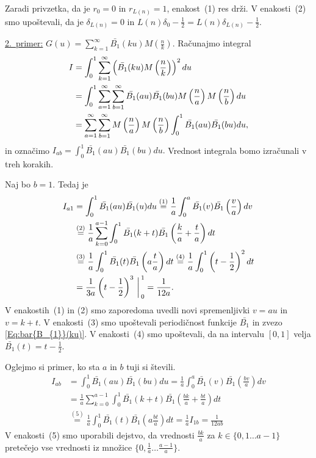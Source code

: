 \documentclass[mat1]{fmfdelo}
\begin{document}
Zaradi privzetka, da je $r_{0}=0$ in $r_{L(n)}=1$, enakost~(1) res drži.
V enakosti~(2) smo upoštevali, da je $\delta_{L(n)}=0$ in $L(n) \delta_{0}-\frac{1}{2} = L(n) \delta_{L(n)}-\frac{1}{2}.$

\underline{2.~primer:} $G(u) = \sum_{k=1}^{\infty} \bar{B_{1}}(ku) M \left(\frac{n}{k} \right)$.
Računajmo integral
\begin{align}
\label{Eq:I_{ab}}
I &= \int_{0}^1 \sum_{k=1}^{\infty} \left( \bar{B_{1}}(ku) M \left(\frac{n}{k} \right) \right)^2 du \nonumber \\
  &= \int_{0}^1 \sum_{a=1}^{\infty} \sum_{b=1}^{\infty} \bar{B_{1}}(au) \bar{B_{1}}(bu) M \left(\frac{n}{a} \right) M \left(\frac{n}{b} \right) du \nonumber \\
  &= \sum_{a=1}^{\infty} \sum_{b=1}^{\infty} M \left(\frac{n}{a} \right) M \left(\frac{n}{b} \right) \int_{0}^1 \bar{B_{1}}(au) \bar{B_{1}}(bu) du,
\end{align}
% 
in označimo $I_{ab} = \int_{0}^1 \bar{B_{1}}(au) \bar{B_{1}}(bu) du.$ Vrednost integrala bomo izračunali v treh korakih.

Naj bo $b=1$. Tedaj je
\begin{align}
I_{a1} &= \int_{0}^1 \bar{B_{1}}(au) \bar{B_{1}}(u) du
	\stackrel{(1)}{=} \frac{1}{a} \int_{0}^a \bar{B_{1}}(v) \bar{B_{1}} \left(\frac{v}{a} \right) dv \nonumber \\
	&\stackrel{(2)}{=} \frac{1}{a} \sum_{k=0}^{a-1} \int_{0}^1 \bar{B_{1}}(k+t) \bar{B_{1}} \left(\frac{k}{a}+\frac{t}{a} \right) dt \nonumber \\
	&\stackrel{(3)}{=} \frac{1}{a} \int_{0}^1 \bar{B_{1}}(t) \bar{B_{1}} \left(a\frac{t}{a} \right) dt
	\stackrel{(4)}{=} \frac{1}{a} \int_{0}^1 \left( t-\frac{1}{2} \right)^2 dt \nonumber \\
	&= \frac{1}{3a} \left( t-\frac{1}{2} \right)^3 \bigg \arrowvert_{0}^{1}
	= \frac{1}{12a}.
\end{align}
V enakostih~(1) in (2) smo zaporedoma uvedli novi spremenljivki $v=au$ in $v=k+t$. V enakosti~(3) smo upoštevali periodičnost funkcije $\bar{B_{1}}$ in zvezo \eqref{Eq:bar{B_{1}}(ku)}. V enakosti~(4) smo upoštevali, da na intervalu $[0,1]$ velja $\bar{B_{1}}(t) = t-\frac{1}{2}$.

Oglejmo si primer, ko sta $a$ in $b$ tuji si števili.
\begin{align}
I_{ab} &= \int_{0}^1 \bar{B_{1}}(au) \bar{B_{1}}(bu) du
	= \frac{1}{a} \int_{0}^a \bar{B_{1}}(v) \bar{B_{1}} \left(\frac{bv}{a} \right) dv \nonumber \\
	&= \frac{1}{a} \sum_{k=0}^{a-1} \int_{0}^1 \bar{B_{1}}(k+t) \bar{B_{1}} \left(\frac{bk}{a}+\frac{bt}{a} \right) dt \nonumber \\
	&\stackrel{(5)}{=} \frac{1}{a} \int_{0}^1 \bar{B_{1}}(t) \bar{B_{1}} \left(a\frac{bt}{a} \right) dt
	= \frac{1}{a} I_{1b} 
	= \frac{1}{12ab} 
\end{align}
V enakosti~(5) smo uporabili dejstvo, da vrednosti $\frac{bk}{a}$ za $k \in \{0,1 \ldots a-1 \}$ pretečejo vse vrednosti iz množice $\{0, \frac{1}{a} \ldots \frac{a-1}{a}\}$.
\end{document}
